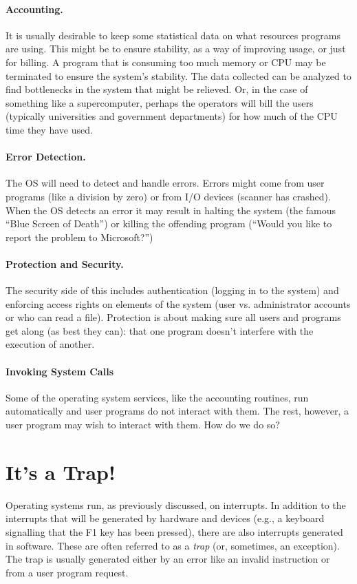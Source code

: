 \paragraph{Accounting.} It is usually desirable to keep some statistical data on what resources programs are using. This might be to ensure stability, as a way of improving usage, or just for billing. A program that is consuming too much memory or CPU may be terminated to ensure the system's stability. The data collected can be analyzed to find bottlenecks in the system that might be relieved. Or, in the case of something like a supercomputer, perhaps the operators will bill the users (typically universities and government departments) for how much of the CPU time they have used.

\paragraph{Error Detection.} The OS will need to detect and handle errors. Errors might come from user programs (like a division by zero) or from I/O devices (scanner has crashed). When the OS detects an error it may result in halting the system (the famous ``Blue Screen of Death'') or killing the offending program (``Would you like to report the problem to Microsoft?'')

\paragraph{Protection and Security.} The security side of this includes authentication (logging in to the system) and enforcing access rights on elements of the system (user vs. administrator accounts or who can read a file). Protection is about making sure all users and programs get along (as best they can): that one program doesn't interfere with the execution of another.


\paragraph{Invoking System Calls}
Some of the operating system services, like the accounting routines, run automatically and user programs do not interact with them. The rest, however, a user program may wish to interact with them. How do we do so?

\section*{It's a Trap!}
Operating systems run, as previously discussed, on interrupts. In addition to the interrupts that will be generated by hardware and devices (e.g., a keyboard signalling that the F1 key has been pressed), there are also interrupts generated in software. These are often referred to as a \textit{trap} (or, sometimes, an exception). The trap is usually generated either by an error like an invalid instruction or from a user program request. 

